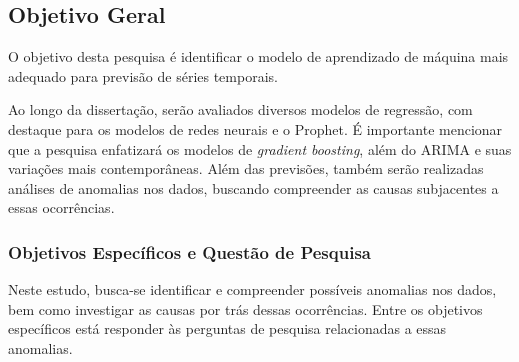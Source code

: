 \subsection{Objetivo Geral} \label{subsec:objetivos}

O objetivo desta pesquisa é identificar o modelo de aprendizado de máquina mais adequado para previsão de séries temporais. 

Ao longo da dissertação, serão avaliados diversos modelos de regressão, com destaque para os modelos de redes neurais e o Prophet. É importante mencionar que a pesquisa enfatizará os modelos de \textit{gradient boosting}, além do ARIMA e suas variações mais contemporâneas. Além das previsões, também serão realizadas análises de anomalias nos dados, buscando compreender as causas subjacentes a essas ocorrências.
 
    
    
    \subsubsection{Objetivos Espec\'ificos e Quest\~ao de Pesquisa} \label{subsubsec:obespec}
    
Neste estudo, busca-se identificar e compreender possíveis anomalias nos dados, bem como investigar as causas por trás dessas ocorrências. Entre os objetivos específicos está responder às perguntas de pesquisa relacionadas a essas anomalias.

